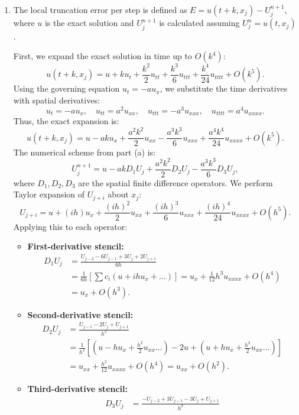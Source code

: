 \begin{solution}
\begin{enumerate}[label=(\alph*)]
    \item The local truncation error per step is defined as $E = u(t+k, x_j) - U_j^{n+1}$, where $u$ is the exact solution and $U_j^{n+1}$ is calculated assuming $U_j^n = u(t, x_j)$.
    
    First, we expand the exact solution in time up to $O(k^4)$:
    \[ u(t+k, x_j) = u + k u_t + \frac{k^2}{2} u_{tt} + \frac{k^3}{6} u_{ttt} + \frac{k^4}{24} u_{tttt} + O(k^5). \]
    Using the governing equation $u_t = -au_x$, we substitute the time derivatives with spatial derivatives:
    \[ u_t = -au_x, \quad u_{tt} = a^2 u_{xx}, \quad u_{ttt} = -a^3 u_{xxx}, \quad u_{tttt} = a^4 u_{xxxx}. \]
    Thus, the exact expansion is:
    \[ u(t+k, x_j) = u - ak u_x + \frac{a^2k^2}{2} u_{xx} - \frac{a^3k^3}{6} u_{xxx} + \frac{a^4k^4}{24} u_{xxxx} + O(k^5). \]
    The numerical scheme from part (a) is:
    \[ U_j^{n+1} = u - ak D_1 U_j + \frac{a^2k^2}{2} D_2 U_j - \frac{a^3k^3}{6} D_3 U_j, \]
    where $D_1, D_2, D_3$ are the spatial finite difference operators. We perform Taylor expansion of $U_{j+i}$ about $x_j$:
    \[ U_{j+i} = u + (ih) u_x + \frac{(ih)^2}{2} u_{xx} + \frac{(ih)^3}{6} u_{xxx} + \frac{(ih)^4}{24} u_{xxxx} + O(h^5). \]
    Applying this to each operator:
    \begin{itemize}
        \item \textbf{First-derivative stencil:}
        \begin{align*}
        D_1 U_j &= \frac{U_{j-2} - 6U_{j-1} + 3U_j + 2U_{j+1}}{6h} \\
        &= \frac{1}{6h} \left[ \sum c_i (u + ih u_x + \dots) \right] = u_x + \frac{1}{12} h^3 u_{xxxx} + O(h^4) \\
        &= u_x + O(h^3).
        \end{align*}
        \item \textbf{Second-derivative stencil:}
        \begin{align*}
        D_2 U_j &= \frac{U_{j-1} - 2U_j + U_{j+1}}{h^2} \\
        &= \frac{1}{h^2} \left[ (u - h u_x + \frac{h^2}{2} u_{xx} \dots) - 2u + (u + h u_x + \frac{h^2}{2} u_{xx} \dots) \right] \\
        &= u_{xx} + \frac{h^2}{12} u_{xxxx} + O(h^4) = u_{xx} + O(h^2).
        \end{align*}
        \item \textbf{Third-derivative stencil:}
        \begin{align*}
        D_3 U_j &= \frac{-U_{j-2} + 3U_{j-1} - 3U_j + U_{j+1}}{h^3} \\

\end{align*}
\end{itemize}
\end{enumerate}
\end{solution}

